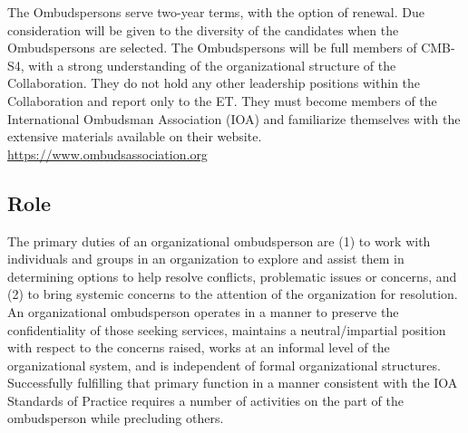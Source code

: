 \documentclass[12pt]{article}
\newcommand{\exec}{{Executive Team}}
\newcommand{\shorte}{{ET}}  %
\newcommand\collabname{CMB-S4}
\begin{document}
The Ombudspersons serve two-year terms, with the option of renewal. Due consideration will be given to the diversity of the candidates when the Ombudspersons are selected. The Ombudspersons will be full members of \collabname, with a strong understanding of the organizational structure of the Collaboration. They do not hold any other leadership positions within the Collaboration and report only to the \shorte. They must become members of the International Ombudsman Association (IOA) and familiarize themselves with the extensive materials available on their website. \url{https://www.ombudsassociation.org}


\subsection{Role}

The primary duties of an organizational ombudsperson are (1) to work with individuals and groups in an organization to explore and assist them in determining options to help resolve conflicts, problematic issues or concerns, and (2) to bring systemic concerns to the attention of the organization for resolution. An organizational ombudsperson operates in a manner to preserve the confidentiality of those seeking services, maintains a neutral/impartial position with respect to the concerns raised, works at an informal level of the organizational system, and is independent of formal organizational structures. Successfully fulfilling that primary function in a manner consistent with the IOA Standards of Practice requires a number of activities on the part of the ombudsperson while precluding others.
\end{document}

